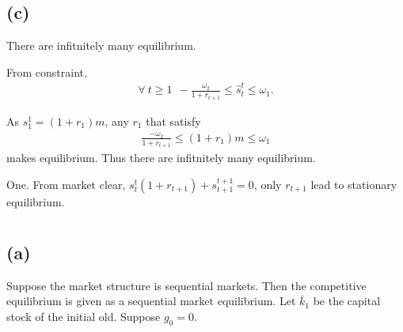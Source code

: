 \documentclass{ltjsarticle}
\begin{document}
\subsection{(c)}
There are infitnitely many equilibrium.

From constraint,
\begin{align*}
  \forall\ t\geq 1\ \  -\frac{\omega_2}{1+r_{t+1}} \leq \hat{s}^t_t \leq \omega_1.
\end{align*}

As  $s^1_1 =  (1+r_1)m$, any $r_1$ that satisfy
\begin{align*}
  \frac{-\omega_2}{1+r_{t+1}} \leq (1+r_1)m \leq \omega_1
\end{align*}
makes equilibrium. Thus there are infitnitely many equilibrium.


One. From market clear, $s^t_t(1+r_{t+1}) + s^{t+1}_{t+1}=0$, only $r_{t+1}$ lead to stationary equilibrium.

\section{} %

\subsection*{(a)}

Suppose the market structure is sequential markets. Then the competitive equilibrium is given as a sequential market equilibrium.
Let $\bar{k}_1$ be the capital stock of the initial old. Suppose $g_0 = 0$.
\end{document}
